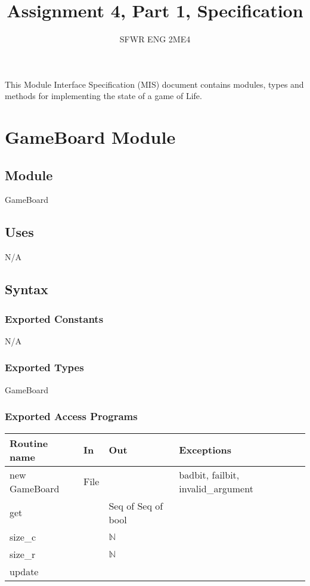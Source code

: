 \documentclass[12pt]{article}
\title{Assignment 4, Part 1, Specification}
\author{SFWR ENG 2ME4}
\begin{document}
\maketitle
This Module Interface Specification (MIS) document contains modules, types and
methods for implementing the state of a game of Life.

\newpage

\section* {GameBoard Module}

\subsection*{Module}

GameBoard

\subsection* {Uses}

N/A

\subsection* {Syntax}

\subsubsection* {Exported Constants}

N/A

\subsubsection* {Exported Types}

GameBoard

\subsubsection* {Exported Access Programs}

\begin{tabular}{| l | l | l | p{5cm} |}
\hline
\textbf{Routine name} & \textbf{In} & \textbf{Out} & \textbf{Exceptions}\\
\hline
new GameBoard & File & & badbit, failbit, invalid\_argument\\
\hline
get &  & Seq of Seq of bool & \\
\hline
size\_c & & $\mathbb{N}$ & \\
\hline
size\_r & & $\mathbb{N}$ & \\
\hline
update& &  & \\
\hline
\end{tabular}
\end{document}
